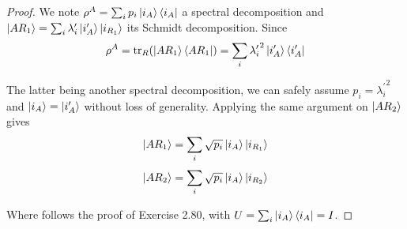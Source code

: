 \documentclass[../main.tex]{subfiles}
\begin{document}
\bigskip
\begin{exercise}
\end{exercise}
\begin{proof}
    We note $\rho^A=\sum_i p_i\ket{i_A}\bra{i_A}$ a spectral decomposition and $\ket{AR_1}=\sum_i\lambda^\prime_i \ket{i^\prime_A}\ket{i_{R_1}}$ its Schmidt decomposition. Since
    \begin{equation*}
        \rho^A=\mathrm{tr}_R(\ket{AR_1}\bra{AR_1})=\sum_i{\lambda_i^\prime}^2\ket{i^\prime_A}\bra{i^\prime_A}
    \end{equation*}
    
    The latter being another spectral decomposition, we can safely assume $p_i={\lambda^\prime_i}^2$ and $\ket{i_A}=\ket{i^\prime_A}$ without loss of generality. Applying the same argument on $\ket{AR_2}$ gives
    \begin{equation*}
        \ket{AR_1}=\sum_i\sqrt{p_i}\ket{i_A}\ket{i_{R_1}}
    \end{equation*}
    \begin{equation*}
        \ket{AR_2}=\sum_i\sqrt{p_i}\ket{i_A}\ket{i_{R_2}}
    \end{equation*}
    
    Where follows the proof of Exercise 2.80, with $U=\sum_i \ket{i_A}\bra{i_A}=I$.
\end{proof}
\end{document}
